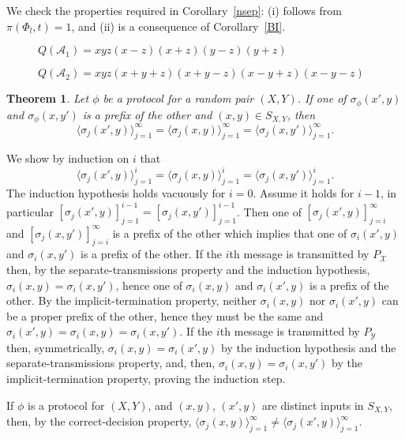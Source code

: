 \documentclass[draft]{amsart}
\newtheorem{thm}{Theorem}[section]
\theoremstyle{definition}
\theoremstyle{remark}
\newcommand{\A}{\mathcal{A}}
\newcommand{\st}{\sigma}
\newcommand{\XcY}{{(X,Y)}}
\newcommand{\SXY}{{S_{X,Y}}}
\newcommand{\PY}{{P_{\mathcal{Y}}}}
\newcommand{\X}{\mathcal{X}}
\begin{document}
\begin{pf}
We check the properties required in Corollary~\ref{nsep}:
(i) follows from $\pi (\Phi_{ l},t) = 1$, and (ii) is a
consequence of Corollary~\ref{BI}.
\end{pf}

\begin{figure}
\vspace{5cm}
\caption[]{$Q(\A_{1}) = xyz(x-z)(x+z)(y-z)(y+z)$}
\end{figure}

\begin{figure}
\vspace{5cm}
\caption[]{$Q(\A_{2})= xyz(x+y+z)(x+y-z)(x-y+z)(x-y-z)$}
\end{figure}


\begin{thm}
\label{T_first_the_int}
Let $\phi$ be a protocol for a random pair $\XcY$.
If one of $\st_\phi(x',y)$ and $\st_\phi(x,y')$ is a prefix of the other
and $(x,y)\in\SXY$, then
\[
\langle \st_j(x',y)\rangle_{j=1}^\infty
=\langle \st_j(x,y)\rangle_{j=1}^\infty
=\langle \st_j(x,y')\rangle_{j=1}^\infty .
\]
\end{thm}
\begin{pf}
We show by induction on $i$ that
\[
\langle \st_j(x',y)\rangle_{j=1}^i
=\langle \st_j(x,y)\rangle_{j=1}^i
=\langle \st_j(x,y')\rangle_{j=1}^i.
\]
The induction hypothesis holds vacuously for $i=0$.
Assume it holds for $i-1$, in particular
$[\st_j(x',y)]_{j=1}^{i-1}=[\st_j(x,y')]_{j=1}^{i-1}$.
Then one of $[\st_j(x',y)]_{j=i}^{\infty}$ and $[\st_j(x,y')]_{j=i}^{\infty}$
is a prefix of the other which implies that
one of $\st_i(x',y)$ and $\st_i(x,y')$ is a prefix of the other.
If the $i$th message is transmitted by $P_\X$ then,
by the separate-transmissions property and the induction hypothesis,
$\st_i(x,y)=\st_i(x,y')$,
hence one of $\st_i(x,y)$ and $\st_i(x',y)$ is a prefix of the other.
By the implicit-termination property, neither $\st_i(x,y)$ nor $\st_i(x',y)$
can be a proper prefix of the other, hence they must be the same and
$\st_i(x',y)=\st_i(x,y)=\st_i(x,y')$.
If the $i$th message is transmitted by $\PY$ then, symmetrically,
$\st_i(x,y)=\st_i(x',y)$
by the induction hypothesis and the separate-transmissions property, and, then,
$\st_i(x,y)=\st_i(x,y')$ by the implicit-termination property,
proving the induction step.
\end{pf}

If $\phi$ is a protocol for $(X,Y)$, and $(x,y)$, $(x',y)$ are distinct
inputs in $\SXY$, then, by the correct-decision property,
$\langle\st_j(x,y)\rangle_{j=1}^\infty\ne\langle \st_j(x',y)\rangle_{j=1}^\infty$.
\end{document}
